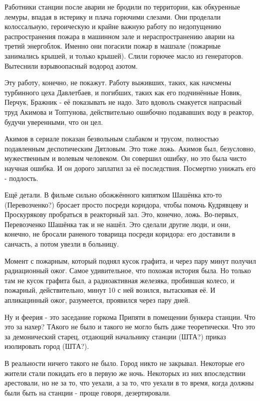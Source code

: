 Работники станции после аварии не бродили по территории, как обкуренные лемуры,
впадая в истерику и плача горючими слезами. Они проделали колоссальную,
героическую и крайне важную работу по недопущению распространения пожара в
машинном зале и нераспространению аварии на третий энергоблок. Именно они
погасили пожар в машзале (пожарные занимались крышей, и только крышей). Слили
горючее масло из генераторов. Вытеснили взрывоопасный водород азотом.

Эту работу, конечно, не покажут. Работу выживших, таких, как начсмены
турбинного цеха Давлетбаев, и погибших, таких как его подчинённые Новик,
Перчук, Бражник - её показывать не надо. Зато вдоволь смакуется напрасный труд
Акимова и Топтунова, действительно ошибочно подававших воду в реактор, будучи
уверенными, что он цел.

Акимов в сериале показан безвольным слабаком и трусом, полностью подавленным
деспотическим Дятловым. Это тоже ложь. Акимов был, безусловно, мужественным и
волевым человеком. Он совершил ошибку, но это была чисто научная ошибка. И он
дорого заплатил за её последствия. Посмертно унижать его - подлость.

Ещё детали. В фильме сильно обожжённого кипятком Шашёнка кто-то (Перевозченко?)
бросает просто посреди коридора, чтобы помочь Кудрявцеву и Проскурякову
пробраться в реакторный зал. Это, конечно, ложь. Во-первых, Перевозченко
Шашёнка так и не нашёл. Это сделали другие люди, и они, конечно, не бросали
раненого товарища посреди коридора: его доставили в санчасть, а потом увезли в
больницу.

Момент с пожарным, который поднял кусок графита, и через пару минут получил
радиационный ожог. Самое удивительное, что похожая история была. Но только там
не кусок графита был, а радиоактивная железяка, пробившая колесо, и пожарный,
действительно, минут 10 с ней возился, вытаскивая её. И апликацинный ожог,
разумеется, проявился через пару дней.

Ну и феерия - это заседание горкома Припяти в помещении бункера станции. Что
это за нахер? ТАкого не было и такого не могло быть даже теоретически. Что это
за демонический старец, отдающий начальнику станции (ШТА?) приказ изолировать
город (ШТА?).

В реальности ничего такого не было. Город никто не закрывал. Некоторые его
жители стали покидать его в первую же ночь. Некоторых из них впоследствии
арестовали, но не за то, что уехали, а за то, что уехали в то время, когда
должны были быть на станции - проще говоря, дезертировали.

